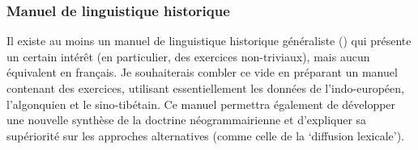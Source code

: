 \documentclass[oldfontcommands,oneside,a4paper,11pt]{article}
\begin{document}
\subsubsection{Manuel de linguistique historique}

Il existe au moins un manuel de linguistique historique généraliste (\citealt{hock91principles}) qui présente un certain intérêt (en particulier, des exercices non-triviaux), mais aucun équivalent en français. Je souhaiterais combler ce vide en préparant un manuel contenant des exercices, utilisant essentiellement les données de l'indo-européen, l'algonquien et le sino-tibétain. Ce manuel permettra également de développer une nouvelle synthèse de la doctrine néogrammairienne et d'expliquer sa supériorité sur les approches alternatives  (comme celle de la `diffusion lexicale').
\end{document}
